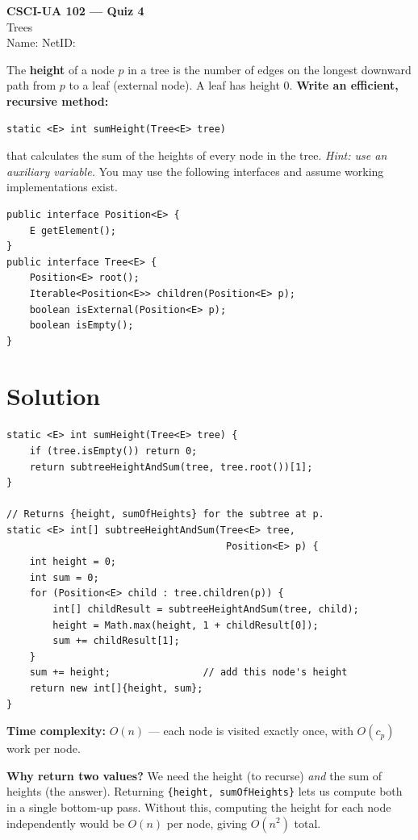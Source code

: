 \documentclass[11pt]{article}
\begin{document}
\begin{center}
  {\Large \textbf{CSCI-UA 102 --- Quiz 4}} \\[6pt]
  {\large Trees} \\[4pt]
  Name: \underline{\hspace{2.5in}} \quad NetID: \underline{\hspace{1.5in}}
\end{center}

The \textbf{height} of a node $p$ in a tree is the number of edges on the longest downward path from $p$ to a leaf (external node). A leaf has height 0. \noindent\textbf{Write an efficient, recursive method:}
\begin{lstlisting}
static <E> int sumHeight(Tree<E> tree)
\end{lstlisting}
that calculates the sum of the heights of every node in the tree. \noindent\textit{Hint: use an auxiliary variable.}
You may use the following interfaces and assume working implementations exist.
\begin{lstlisting}
public interface Position<E> {
    E getElement();
}
public interface Tree<E> {
    Position<E> root();
    Iterable<Position<E>> children(Position<E> p);
    boolean isExternal(Position<E> p);
    boolean isEmpty();
}
\end{lstlisting}


\newpage

{\color{blue}
\section*{Solution}

\begin{lstlisting}[basicstyle=\ttfamily\small\color{blue},
  keywordstyle=\bfseries\color{blue!70!black},
  commentstyle=\color{blue!50}]
static <E> int sumHeight(Tree<E> tree) {
    if (tree.isEmpty()) return 0;
    return subtreeHeightAndSum(tree, tree.root())[1];
}

// Returns {height, sumOfHeights} for the subtree at p.
static <E> int[] subtreeHeightAndSum(Tree<E> tree,
                                      Position<E> p) {
    int height = 0;
    int sum = 0;
    for (Position<E> child : tree.children(p)) {
        int[] childResult = subtreeHeightAndSum(tree, child);
        height = Math.max(height, 1 + childResult[0]);
        sum += childResult[1];
    }
    sum += height;                // add this node's height
    return new int[]{height, sum};
}
\end{lstlisting}

\textbf{Time complexity:} $O(n)$ --- each node is visited exactly once, with $O(c_p)$ work per node.

\medskip

\textbf{Why return two values?} We need the height (to recurse) \textit{and} the sum of heights (the answer). Returning \texttt{\{height, sumOfHeights\}} lets us compute both in a single bottom-up pass. Without this, computing the height for each node independently would be $O(n)$ per node, giving $O(n^2)$ total.
}
\end{document}
